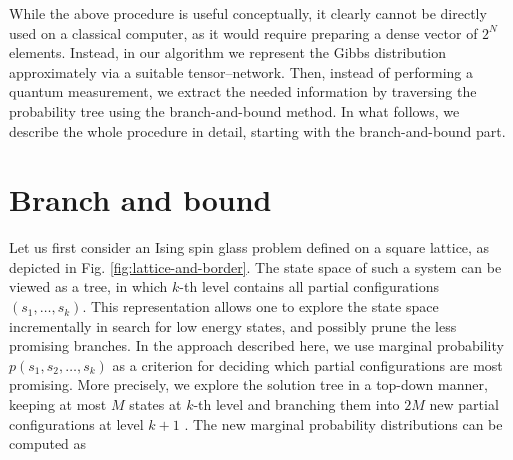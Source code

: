 While the above procedure is useful conceptually, it clearly cannot be directly used
on a classical computer, as it would require preparing a dense vector of $2^{N}$ elements.
Instead, in our algorithm we represent the Gibbs distribution approximately via a suitable
tensor--network. Then, instead of performing a quantum measurement, we extract the needed
information by traversing the probability tree using the branch-and-bound method. In what follows,
we describe the whole procedure in detail, starting with the branch-and-bound part.

\section{Branch and bound}
Let us first consider an Ising spin glass problem defined on a square
lattice, as depicted in Fig. \ref{fig:lattice-and-border}. The state space of
such a system can be viewed as a tree, in which $k$-th level contains all
partial configurations $(s_1, \ldots, s_k)$. This representation allows one to
explore the state space incrementally in search for low energy states, and
possibly prune the less promising branches. In the approach described here, we
use marginal probability $p(s_1, s_2, \ldots, s_k)$ as a criterion for deciding
which partial configurations are most promising. More precisely, we explore the
solution tree in a top-down manner, keeping at most $M$ states at $k$-th level
and branching them into $2M$ new partial configurations at level $k+1$ . The
new marginal probability distributions can be computed as


